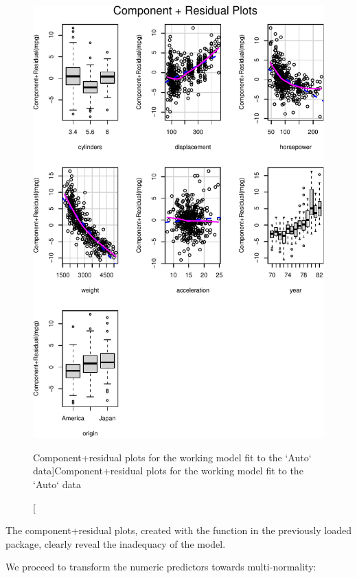 \documentclass[
]{jss}
\begin{document}
\begin{CodeChunk}
\begin{figure}
{\centering \includegraphics[width=1\linewidth]{JSS-article-reduced_files/figure-latex/Auto-working-model-1} 

}

\caption[Component+residual plots for the working model fit to the `Auto` data]{Component+residual plots for the working model fit to the `Auto` data}\label{fig:Auto-working-model}
\end{figure}
\end{CodeChunk}

The component+residual plots, created with the  function
in the previously loaded  package, clearly reveal the
inadequacy of the model.

We proceed to transform the numeric predictors towards multi-normality:
\end{document}
